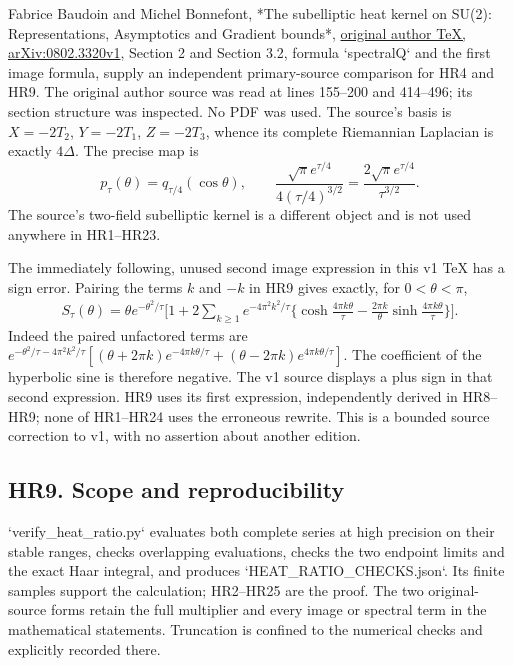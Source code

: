 \documentclass[11pt]{article}
\begin{document}
Fabrice Baudoin and Michel Bonnefont, *The subelliptic heat kernel
on SU(2): Representations, Asymptotics and Gradient bounds*,
\href{https://arxiv.org/src/0802.3320v1}{original author TeX, arXiv:0802.3320v1},
Section 2 and Section 3.2, formula `spectralQ` and the first image
formula, supply an independent primary-source comparison for HR4
and HR9. The original author source was read at lines 155–200 and
414–496; its section structure was inspected. No PDF was used.
The source's basis is
\(X=-2T_2\), \(Y=-2T_1\), \(Z=-2T_3\), whence its complete
Riemannian Laplacian is exactly \(4\Delta\). The precise map is
\[
 p_\tau(\theta)=q_{\tau/4}(\cos\theta),\qquad
 \frac{\sqrt\pi e^{\tau/4}}{4(\tau/4)^{3/2}}
 =\frac{2\sqrt\pi e^{\tau/4}}{\tau^{3/2}}.                  \tag{HR24}
\]
The source's two-field subelliptic kernel is a different object
and is not used anywhere in HR1–HR23.

The immediately following, unused second image expression in
this v1 TeX has a sign error. Pairing the terms \(k\) and \(-k\)
in HR9 gives exactly, for \(0<\theta<\pi\),
\[
 \begin{aligned}
 S_\tau(\theta)
 =\theta e^{-\theta^2/\tau}
 \bigg[1+2\sum_{k\ge1}e^{-4\pi^2k^2/\tau}
 \bigg\{\cosh\frac{4\pi k\theta}{\tau}
 -\frac{2\pi k}{\theta}\sinh\frac{4\pi k\theta}{\tau}\bigg\}\bigg].
 \end{aligned}                                                  \tag{HR25}
\]
Indeed the paired unfactored terms are
\(e^{-\theta^2/\tau-4\pi^2k^2/\tau}
[(\theta+2\pi k)e^{-4\pi k\theta/\tau}
+(\theta-2\pi k)e^{4\pi k\theta/\tau}]\).
The coefficient of the hyperbolic sine is therefore negative.
The v1 source displays a plus sign in that second expression.
HR9 uses its first expression, independently derived in HR8–HR9;
none of HR1–HR24 uses the erroneous rewrite. This is a bounded
source correction to v1, with no assertion about another edition.

\subsection*{HR9. Scope and reproducibility}

`verify\_heat\_ratio.py` evaluates both complete series at high
precision on their stable ranges, checks overlapping evaluations,
checks the two endpoint limits and the exact Haar integral, and
produces `HEAT\_RATIO\_CHECKS.json`. Its finite samples support the
calculation; HR2–HR25 are the proof. The two original-source forms
retain the full multiplier and every image or spectral term in
the mathematical statements. Truncation is confined to the
numerical checks and explicitly recorded there.
\end{document}
